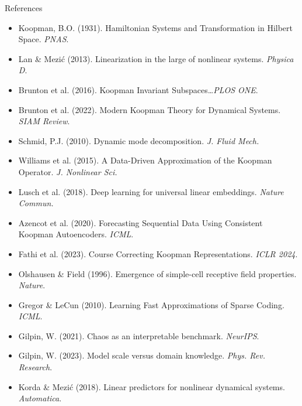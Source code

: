 \documentclass[aspectratio=169, 10pt]{beamer}
\begin{document}
\begin{frame}{References}
  \tiny
  \begin{itemize}
    \item Koopman, B.O. (1931). Hamiltonian Systems and Transformation in Hilbert Space. \textit{PNAS}.
    \item Lan \& Mezi\'c (2013). Linearization in the large of nonlinear systems. \textit{Physica D}.
    \item Brunton et al. (2016). Koopman Invariant Subspaces\ldots \textit{PLOS ONE}.
    \item Brunton et al. (2022). Modern Koopman Theory for Dynamical Systems. \textit{SIAM Review}.
    \item Schmid, P.J. (2010). Dynamic mode decomposition. \textit{J. Fluid Mech.}
    \item Williams et al. (2015). A Data-Driven Approximation of the Koopman Operator. \textit{J. Nonlinear Sci.}
    \item Lusch et al. (2018). Deep learning for universal linear embeddings. \textit{Nature Commun.}
    \item Azencot et al. (2020). Forecasting Sequential Data Using Consistent Koopman Autoencoders. \textit{ICML}.
    \item Fathi et al. (2023). Course Correcting Koopman Representations. \textit{ICLR 2024}.
    \item Olshausen \& Field (1996). Emergence of simple-cell receptive field properties. \textit{Nature}.
    \item Gregor \& LeCun (2010). Learning Fast Approximations of Sparse Coding. \textit{ICML}.
    \item Gilpin, W. (2021). Chaos as an interpretable benchmark. \textit{NeurIPS}.
    \item Gilpin, W. (2023). Model scale versus domain knowledge. \textit{Phys. Rev. Research}.
    \item Korda \& Mezi\'c (2018). Linear predictors for nonlinear dynamical systems. \textit{Automatica}.
  \end{itemize}
\end{frame}
\end{document}
